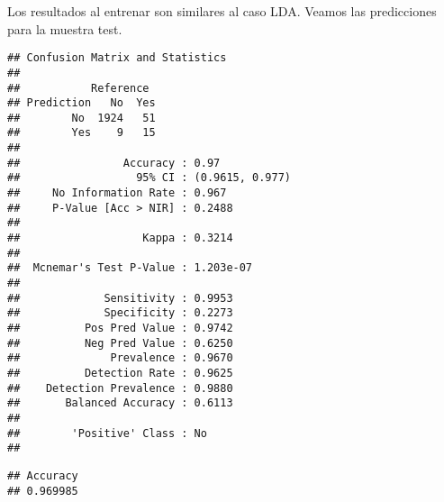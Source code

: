 \documentclass[]{book}
\newenvironment{Shaded}{\begin{snugshade}}{\end{snugshade}}
\newcommand{\CommentTok}[1]{\textcolor[rgb]{0.56,0.35,0.01}{\textit{#1}}}
\newcommand{\DataTypeTok}[1]{\textcolor[rgb]{0.13,0.29,0.53}{#1}}
\newcommand{\DecValTok}[1]{\textcolor[rgb]{0.00,0.00,0.81}{#1}}
\newcommand{\KeywordTok}[1]{\textcolor[rgb]{0.13,0.29,0.53}{\textbf{#1}}}
\newcommand{\NormalTok}[1]{#1}
\newcommand{\OperatorTok}[1]{\textcolor[rgb]{0.81,0.36,0.00}{\textbf{#1}}}
\newcommand{\StringTok}[1]{\textcolor[rgb]{0.31,0.60,0.02}{#1}}
\begin{document}
Los resultados al entrenar son similares al caso LDA. Veamos las predicciones para la muestra test.

\begin{Shaded}
\end{Shaded}

\begin{verbatim}
## Confusion Matrix and Statistics
## 
##           Reference
## Prediction   No  Yes
##        No  1924   51
##        Yes    9   15
##                                          
##                Accuracy : 0.97           
##                  95% CI : (0.9615, 0.977)
##     No Information Rate : 0.967          
##     P-Value [Acc > NIR] : 0.2488         
##                                          
##                   Kappa : 0.3214         
##                                          
##  Mcnemar's Test P-Value : 1.203e-07      
##                                          
##             Sensitivity : 0.9953         
##             Specificity : 0.2273         
##          Pos Pred Value : 0.9742         
##          Neg Pred Value : 0.6250         
##              Prevalence : 0.9670         
##          Detection Rate : 0.9625         
##    Detection Prevalence : 0.9880         
##       Balanced Accuracy : 0.6113         
##                                          
##        'Positive' Class : No             
## 
\end{verbatim}

\begin{Shaded}
\end{Shaded}

\begin{verbatim}
## Accuracy 
## 0.969985
\end{verbatim}
\end{document}
